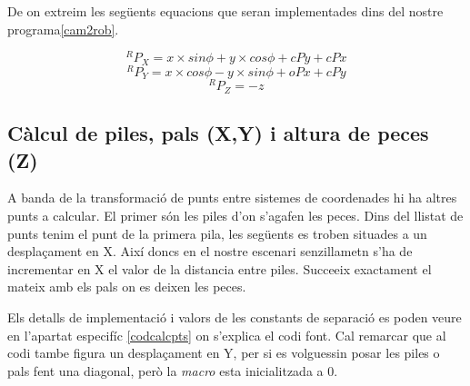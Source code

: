 De on extreim les següents equacions que seran implementades dins del
nostre programa\ref{cam2rob}.

$$^RP_X = x\times sin \phi + y \times cos \phi + cPy + cPx$$
$$^RP_Y = x\times cos \phi - y \times sin \phi + oPx + cPy$$
$$^RP_Z = -z$$

\subsection{Càlcul de piles, pals (X,Y) i altura de peces (Z)} \label{calcpts}
A banda de la transformació de punts entre sistemes de coordenades hi ha altres punts a calcular.
El primer són les piles d'on s'agafen les peces. Dins del llistat de punts tenim el punt de la primera
pila, les següents es troben situades a un desplaçament en X. Així doncs en el nostre escenari
senzillametn s'ha de incrementar en X el valor de la distancia entre piles. Succeeix exactament
el mateix amb els pals on es deixen les peces.

Els detalls de implementació i valors de les constants de separació es poden veure en l'apartat
especifíc \ref{codcalcpts} on s'explica el codi font. Cal remarcar que al codi tambe figura un
desplaçament en Y, per si es volguessin posar les piles o pals fent una diagonal, però la \emph{macro}
esta inicialitzada a 0.




